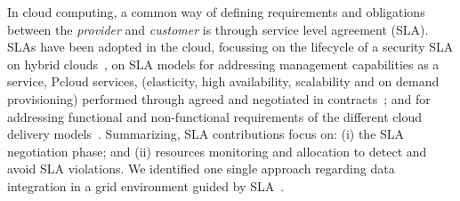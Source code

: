 \documentclass[11pt,a4paper,oneside]{report}
\begin{document}
In cloud computing, a common way of defining requirements and obligations between the \textit{ provider} and \textit{ customer} is through service level agreement (SLA). 
SLAs have been  adopted in the cloud, focussing   on the lifecycle of a security SLA on hybrid clouds~\cite{011}, on SLA models for addressing  management capabilities  as a service, Pcloud services, (elasticity, high availability, scalability and on demand provisioning)  performed through agreed and negotiated in contracts~\cite{009}; and for addressing functional and non-functional requirements of the different cloud delivery models~\cite{005}.
%
%
Summarizing, SLA contributions focus on: (i)   the SLA negotiation phase; and (ii)  resources monitoring and allocation  to detect and avoid SLA violations. We identified one single approach regarding data integration in a grid environment guided by SLA~\cite{Nie07}.
%
%
%
\end{document}
